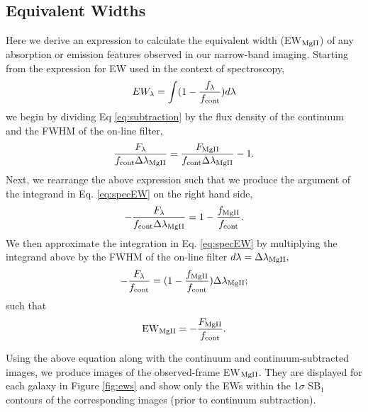 \documentclass[twocolumn]{aastex62}
\begin{document}
\subsection{Equivalent Widths}\label{subsec.ew}
Here we derive an expression to calculate the equivalent width (EW$_{\rm{MgII}}$) of any absorption or emission features observed in our narrow-band imaging. Starting from the expression for EW used in the context of spectroscopy,
\begin{equation}
EW_{\lambda}=\int (1-\frac{f_{\lambda}}{f_{\rm{cont}}})d\lambda
\label{eq:specEW}
\end{equation}
we begin by dividing Eq \ref{eq:subtraction} by the flux density of the continuum and the FWHM of the on-line filter,
\begin{equation}
\frac{F_{\lambda}}{f_{\rm{cont}}\Delta \lambda_{\rm{MgII}}}=\frac{F_{\rm{MgII}}}{f_{\rm{cont}}\Delta \lambda_{\rm{MgII}}}- 1.
\end{equation}
Next, we rearrange the above expression such that we produce the argument of the integrand in Eq. \ref{eq:specEW} on the right hand side,
\begin{equation}
-\frac{F_{\lambda}}{f_{\rm{cont}}\Delta \lambda_{\rm{MgII}}}=1-\frac{f_{\rm{MgII}}}{f_{\rm{cont}}}.
\end{equation}
We then approximate the integration in Eq. \ref{eq:specEW} by multiplying the integrand above by the FWHM of the on-line filter $d\lambda=\Delta \lambda_{\rm{MgII}},$
\begin{equation}
-\frac{F_{\lambda}}{f_{\rm{cont}}}=(1-\frac{f_{\rm{MgII}}}{f_{\rm{cont}}})\Delta \lambda_{\rm{MgII}};
\end{equation}
such that
\begin{equation}
{\rm EW}_{\rm{MgII}}=-\frac{F_{\rm{MgII}}}{f_{\rm{cont}}}.
\end{equation}

Using the above equation along with the continuum and continuum-subtracted images, we produce images of the observed-frame EW$_{\rm{MgII}}$. %
They are displayed for each galaxy in Figure \ref{fig:ews} and show only the EWs within the 1$\sigma$ SB$_1$ contours of the corresponding  images (prior to continuum subtraction). 
\end{document}
